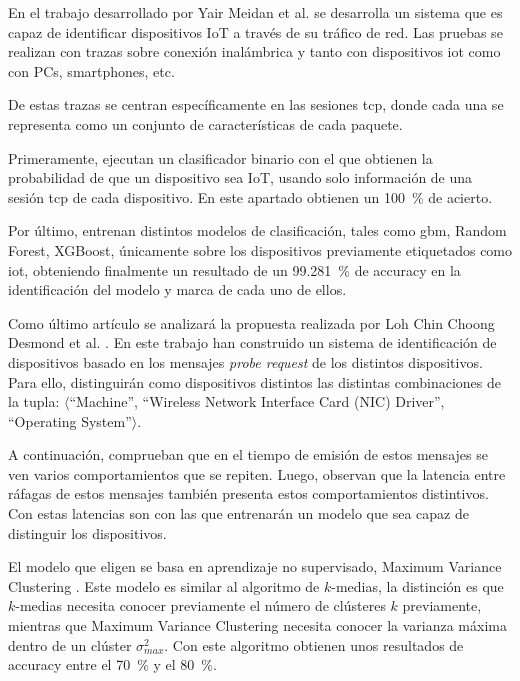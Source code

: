 En el trabajo desarrollado por Yair Meidan et al. \cite{meidan2017profiliot} se desarrolla un sistema que es capaz de identificar dispositivos IoT a través de su tráfico de red. Las pruebas se realizan con trazas sobre conexión inalámbrica y tanto con dispositivos \acrshort{iot} como con PCs, smartphones, etc. 

De estas trazas se centran específicamente en las sesiones \acrshort{tcp}, donde cada una se representa como un conjunto de características de cada paquete.

Primeramente, ejecutan un clasificador binario con el que obtienen la probabilidad de que un dispositivo sea IoT, usando solo información de una sesión \acrshort{tcp} de cada dispositivo. En este apartado obtienen un \SI{100}{\percent} de acierto.

Por último, entrenan distintos modelos de clasificación, tales como \acrfull{gbm}, Random Forest, XGBoost, únicamente sobre los dispositivos previamente etiquetados como \acrshort{iot}, obteniendo finalmente un resultado de un \SI{99.281}{\percent} de accuracy en la identificación del modelo y marca de cada uno de ellos.

Como último artículo se analizará la propuesta realizada por Loh Chin Choong Desmond et al. \cite{desmond2008identifying}. En este trabajo han construido un sistema de identificación de dispositivos basado en los mensajes \textit{probe request} de los distintos dispositivos. Para ello, distinguirán como dispositivos distintos las distintas combinaciones de la tupla: $\langle$``Machine'', ``Wireless Network Interface Card (NIC) Driver'', ``Operating System''$\rangle$.

A continuación, comprueban que en el tiempo de emisión de estos mensajes se ven varios comportamientos que se repiten. Luego, observan que la latencia entre ráfagas de estos mensajes también presenta estos comportamientos distintivos. Con estas latencias son con las que entrenarán un modelo que sea capaz de distinguir los dispositivos.

El modelo que eligen se basa en aprendizaje no supervisado, Maximum Variance Clustering \cite{veenman2002maximum}. Este modelo es similar al algoritmo de $k$-medias, la distinción es que $k$-medias necesita conocer previamente el número de clústeres $k$ previamente, mientras que Maximum Variance Clustering necesita conocer la varianza máxima dentro de un clúster $\sigma^2_{max}$. Con este algoritmo obtienen unos resultados de accuracy entre el \SI{70}{\percent} y el \SI{80}{\percent}.



